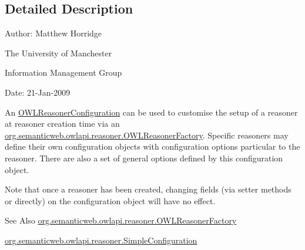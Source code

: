 \subsection{Detailed Description}
Author\-: Matthew Horridge\par
 The University of Manchester\par
 Information Management Group\par
 Date\-: 21-\/\-Jan-\/2009 

An \hyperlink{interfaceorg_1_1semanticweb_1_1owlapi_1_1reasoner_1_1_o_w_l_reasoner_configuration}{O\-W\-L\-Reasoner\-Configuration} can be used to customise the setup of a reasoner at reasoner creation time via an \hyperlink{interfaceorg_1_1semanticweb_1_1owlapi_1_1reasoner_1_1_o_w_l_reasoner_factory}{org.\-semanticweb.\-owlapi.\-reasoner.\-O\-W\-L\-Reasoner\-Factory}. Specific reasoners may define their own configuration objects with configuration options particular to the reasoner. There are also a set of general options defined by this configuration object. 

Note that once a reasoner has been created, changing fields (via setter methods or directly) on the configuration object will have no effect.

\begin{DoxySeeAlso}{See Also}
\hyperlink{interfaceorg_1_1semanticweb_1_1owlapi_1_1reasoner_1_1_o_w_l_reasoner_factory}{org.\-semanticweb.\-owlapi.\-reasoner.\-O\-W\-L\-Reasoner\-Factory} 

\hyperlink{classorg_1_1semanticweb_1_1owlapi_1_1reasoner_1_1_simple_configuration}{org.\-semanticweb.\-owlapi.\-reasoner.\-Simple\-Configuration} 
\end{DoxySeeAlso}


